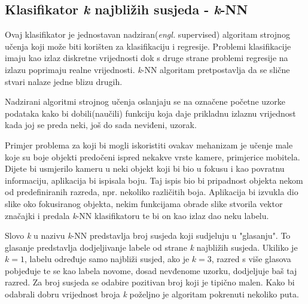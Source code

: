 \documentclass[times, utf8, zavrsni]{fer}
\begin{document}
\newpage

\subsection{Klasifikator \textit{k} najbližih susjeda - \textit{k}-NN}

Ovaj klasifikator je jednostavan nadziran(\textit{engl.} supervised)
algoritam strojnog učenja koji može biti korišten za klasifikaciju
i regresije. Problemi klasifikacije imaju kao izlaz diskretne vrijednosti
dok s druge strane problemi regresije na izlazu poprimaju realne vrijednosti.
\textit{k}-NN algoritam pretpostavlja da se slične stvari nalaze 
jedne blizu drugih.

\bigbreak

Nadzirani algoritmi strojnog učenja oslanjaju se na označene početne uzorke
podataka kako bi dobili(naučili) funkciju koja daje prikladnu izlaznu vrijednost
kada joj se preda neki, još do sada neviđeni, uzorak. 

\bigbreak

Primjer problema 
za koji bi mogli iskoristiti ovakav mehanizam je učenje male koje su boje
objekti predočeni ispred nekakve vrste kamere, primjerice mobitela. Dijete
bi usmjerilo kameru u neki objekt koji bi bio u fokusu i kao povratnu informaciju,
aplikacija bi ispisala boju. Taj ispis bio bi pripadnost objekta nekom od predefiniranih 
razreda, npr. nekoliko različitih boja. Aplikacija bi izvukla 
dio slike oko fokusiranog objekta, nekim funkcijama obrade slike stvorila
vektor značajki i predala \textit{k}-NN klasifikatoru te bi on kao izlaz dao 
neku labelu. 

\bigbreak

Slovo \textit{k} u nazivu \textit{k}-NN predstavlja broj susjeda koji sudjeluju
u "glasanju". To glasanje predstavlja dodjeljivanje labele od strane \textit{k}
najbližih susjeda. Ukiliko je \(k=1\), labelu određuje samo najbliži susjed,
ako je \(k=3\), razred s više glasova pobjeđuje te se kao labela novome, dosad
nevđenome uzorku, dodjeljuje baš taj razred. Za broj susjeda se odabire pozitivan
broj koji je tipično malen. Kako bi odabrali dobru vrijednost broja \textit{k} poželjno
je algoritam pokrenuti nekoliko puta. 
\end{document}
